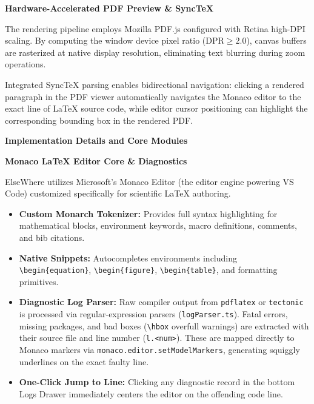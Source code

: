 \documentclass[12pt,a4paper,twoside]{article}
\newcommand{\numhead}[3]{%
  \begingroup\setlength{\parskip}{0pt}%
  \noindent\hspace*{0.25in}\makebox[0.25in][l]{\fontsize{18pt}{21.6pt}\selectfont\bfseries #1.}%
  {\fontsize{18pt}{21.6pt}\selectfont\bfseries #2}{\fontsize{18pt}{21.6pt}\selectfont #3}\par\nopagebreak
  \vspace{6pt}
  \endgroup}
\newcommand{\subhead}[2]{%
  \begingroup\setlength{\parskip}{0pt}\vspace{10pt}%
  \noindent\hspace*{0.25in}\makebox[0.35in][l]{\fontsize{13pt}{15.6pt}\selectfont\bfseries #1}%
  {\fontsize{13pt}{15.6pt}\selectfont\bfseries #2}\par\nopagebreak
  \vspace{4pt}
  \endgroup}
\newcommand{\code}[1]{\texttt{#1}}
\begin{document}
\subhead{3.4}{Hardware-Accelerated PDF Preview \& Sync\TeX{}}
The rendering pipeline employs Mozilla PDF.js configured with Retina high-DPI scaling. By computing the window device pixel ratio ($\mathrm{DPR} \ge 2.0$), canvas buffers are rasterized at native display resolution, eliminating text blurring during zoom operations.

Integrated Sync\TeX{} parsing enables bidirectional navigation: clicking a rendered paragraph in the PDF viewer automatically navigates the Monaco editor to the exact line of \LaTeX{} source code, while editor cursor positioning can highlight the corresponding bounding box in the rendered PDF.

\newpage
\numhead{4}{Implementation Details and Core Modules}{}

\subhead{4.1}{Monaco \LaTeX{} Editor Core \& Diagnostics}
ElseWhere utilizes Microsoft's Monaco Editor (the editor engine powering VS Code) customized specifically for scientific \LaTeX{} authoring.
\begin{itemize}[leftmargin=0.4in,itemsep=2pt,topsep=2pt,parsep=0pt]
    \item \textbf{Custom Monarch Tokenizer:} Provides full syntax highlighting for mathematical blocks, environment keywords, macro definitions, comments, and bib citations.
    \item \textbf{Native Snippets:} Autocompletes environments including \code{\textbackslash begin\{equation\}}, \code{\textbackslash begin\{figure\}}, \code{\textbackslash begin\{table\}}, and formatting primitives.
    \item \textbf{Diagnostic Log Parser:} Raw compiler output from \code{pdflatex} or \code{tectonic} is processed via regular-expression parsers (\code{logParser.ts}). Fatal errors, missing packages, and bad boxes (\code{\textbackslash hbox} overfull warnings) are extracted with their source file and line number (\code{l.<num>}). These are mapped directly to Monaco markers via \code{monaco.editor.setModelMarkers}, generating squiggly underlines on the exact faulty line.
    \item \textbf{One-Click Jump to Line:} Clicking any diagnostic record in the bottom Logs Drawer immediately centers the editor on the offending code line.
\end{itemize}
\end{document}
